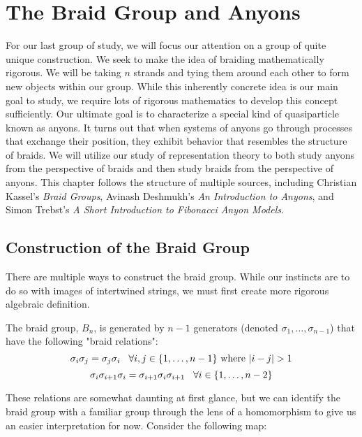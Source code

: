 
\chapter{The Braid Group and Anyons}\label{braids}

For our last group of study, we will focus our attention on a group of quite unique construction. We seek to make the idea of braiding mathematically rigorous. We will be taking $n$ strands and tying them around each other to form new objects within our group. While this inherently concrete idea is our main goal to study, we require lots of rigorous mathematics to develop this concept sufficiently. Our ultimate goal is to characterize a special kind of quasiparticle known as anyons. It turns out that when systems of anyons go through processes that exchange their position, they exhibit behavior that resembles the structure of braids. We will utilize our study of representation theory to both study anyons from the perspective of braids and then study braids from the perspective of anyons. This chapter follows the structure of multiple sources, including Christian Kassel's \textit{Braid Groups}, Avinash Deshmukh's \textit{An Introduction to Anyons}, and Simon Trebst's \textit{A Short Introduction to Fibonacci Anyon Models}. \cite{Kassel,Deshmukh,Trebst}

\section{Construction of the Braid Group}

There are multiple ways to construct the braid group. While our instincts are to do so with images of intertwined strings, we must first create more rigorous algebraic definition.

\begin{definition}
	The braid group, $B_n$, is generated by $n-1$ generators (denoted $\sigma_1,\hdots,\sigma_{n-1}$) that have the following "braid relations":
$$\sigma_i\sigma_j = \sigma_j\sigma_i \hspace{3mm} \forall i,j \in \{1,\hdots,n-1\} \text{ where } |i-j|>1$$
$$\sigma_i\sigma_{i+1}\sigma_i=\sigma_{i+1}\sigma_i\sigma_{i+1} \hspace{3mm} \forall i \in \{1,\hdots,n-2\}$$
\end{definition}

These relations are somewhat daunting at first glance, but we can identify the braid group with a familiar group through the lens of a homomorphism to give us an easier interpretation for now. Consider the following map:

